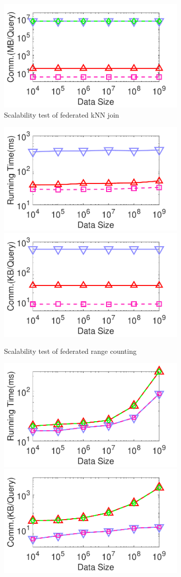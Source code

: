 \begin{figure}[t]
\begin{subfigure}{0.48\textwidth}
        \includegraphics[width=0.48\linewidth]{knnjoin_datasize_cost.pdf}
        \caption{Scalability test of federated kNN join}
        \label{fig:knn-j-eff-size-n}
    \end{subfigure}
    \begin{subfigure}{0.48\textwidth}
        \centering
        \includegraphics[width=0.48\linewidth]{rangecount_datasize_time.pdf}
        \includegraphics[width=0.48\linewidth]{rangecount_datasize_cost.pdf}
        \caption{Scalability test of federated range counting}
        \label{fig:count-eff-size-n}
    \end{subfigure}
    \begin{subfigure}{0.48\textwidth}
        \centering
        \includegraphics[width=0.48\linewidth]{rangequery_datasize_time.pdf}
        \includegraphics[width=0.48\linewidth]{rangequery_datasize_cost.pdf}

\end{subfigure}
\end{figure}
